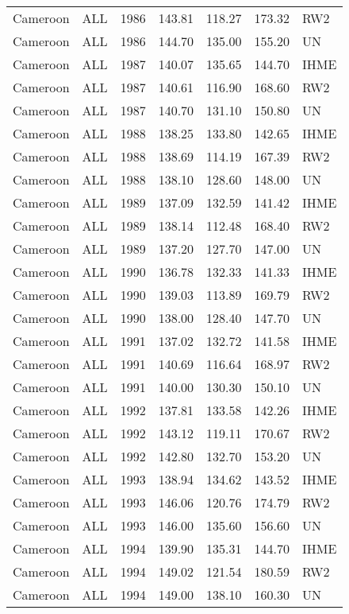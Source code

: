 \begin{longtable}{lllrrrl}
  Cameroon & ALL & 1986 & 143.81 & 118.27 & 173.32 & RW2 \\ 
  Cameroon & ALL & 1986 & 144.70 & 135.00 & 155.20 & UN \\ 
  Cameroon & ALL & 1987 & 140.07 & 135.65 & 144.70 & IHME \\ 
  Cameroon & ALL & 1987 & 140.61 & 116.90 & 168.60 & RW2 \\ 
  Cameroon & ALL & 1987 & 140.70 & 131.10 & 150.80 & UN \\ 
  Cameroon & ALL & 1988 & 138.25 & 133.80 & 142.65 & IHME \\ 
  Cameroon & ALL & 1988 & 138.69 & 114.19 & 167.39 & RW2 \\ 
  Cameroon & ALL & 1988 & 138.10 & 128.60 & 148.00 & UN \\ 
  Cameroon & ALL & 1989 & 137.09 & 132.59 & 141.42 & IHME \\ 
  Cameroon & ALL & 1989 & 138.14 & 112.48 & 168.40 & RW2 \\ 
  Cameroon & ALL & 1989 & 137.20 & 127.70 & 147.00 & UN \\ 
  Cameroon & ALL & 1990 & 136.78 & 132.33 & 141.33 & IHME \\ 
  Cameroon & ALL & 1990 & 139.03 & 113.89 & 169.79 & RW2 \\ 
  Cameroon & ALL & 1990 & 138.00 & 128.40 & 147.70 & UN \\ 
  Cameroon & ALL & 1991 & 137.02 & 132.72 & 141.58 & IHME \\ 
  Cameroon & ALL & 1991 & 140.69 & 116.64 & 168.97 & RW2 \\ 
  Cameroon & ALL & 1991 & 140.00 & 130.30 & 150.10 & UN \\ 
  Cameroon & ALL & 1992 & 137.81 & 133.58 & 142.26 & IHME \\ 
  Cameroon & ALL & 1992 & 143.12 & 119.11 & 170.67 & RW2 \\ 
  Cameroon & ALL & 1992 & 142.80 & 132.70 & 153.20 & UN \\ 
  Cameroon & ALL & 1993 & 138.94 & 134.62 & 143.52 & IHME \\ 
  Cameroon & ALL & 1993 & 146.06 & 120.76 & 174.79 & RW2 \\ 
  Cameroon & ALL & 1993 & 146.00 & 135.60 & 156.60 & UN \\ 
  Cameroon & ALL & 1994 & 139.90 & 135.31 & 144.70 & IHME \\ 
  Cameroon & ALL & 1994 & 149.02 & 121.54 & 180.59 & RW2 \\ 
  Cameroon & ALL & 1994 & 149.00 & 138.10 & 160.30 & UN \\ 

\end{longtable}
